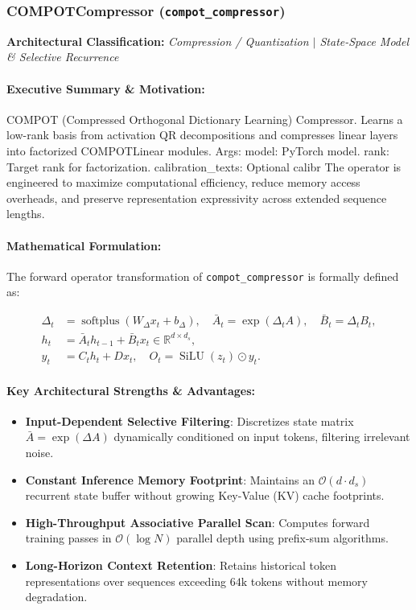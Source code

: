 \subsubsection{COMPOTCompressor (\texttt{compot\_compressor})}
\label{sec:module_compot\_compressor}

\textbf{Architectural Classification:} \textit{Compression / Quantization $\mid$ State-Space Model & Selective Recurrence}

\paragraph{Executive Summary \& Motivation:}
COMPOT (Compressed Orthogonal Dictionary Learning) Compressor. Learns a low-rank basis from activation QR decompositions and compresses linear layers into factorized COMPOTLinear modules.  Args:     model: PyTorch model.     rank: Target rank for factorization.     calibration\_texts: Optional calibr The operator is engineered to maximize computational efficiency, reduce memory access overheads, and preserve representation expressivity across extended sequence lengths.

\paragraph{Mathematical Formulation:}
The forward operator transformation of \texttt{compot\_compressor} is formally defined as:

\begin{align}
\Delta_t &= \operatorname{softplus}(W_\Delta x_t + b_\Delta), \quad \bar{A}_t = \exp(\Delta_t A), \quad \bar{B}_t = \Delta_t B_t, \\
h_t &= \bar{A}_t h_{t-1} + \bar{B}_t x_t \in \mathbb{R}^{d \times d_s}, \\
y_t &= C_t h_t + D x_t, \quad O_t = \operatorname{SiLU}(z_t) \odot y_t.
\end{align}


\paragraph{Key Architectural Strengths \& Advantages:}
\begin{itemize}
    \item \textbf{Input-Dependent Selective Filtering}: Discretizes state matrix $\bar{A} = \exp(\Delta A)$ dynamically conditioned on input tokens, filtering irrelevant noise.
    \item \textbf{Constant Inference Memory Footprint}: Maintains an $\mathcal{O}(d \cdot d_s)$ recurrent state buffer without growing Key-Value (KV) cache footprints.
    \item \textbf{High-Throughput Associative Parallel Scan}: Computes forward training passes in $\mathcal{O}(\log N)$ parallel depth using prefix-sum algorithms.
    \item \textbf{Long-Horizon Context Retention}: Retains historical token representations over sequences exceeding $64\text{k}$ tokens without memory degradation.
\end{itemize}

